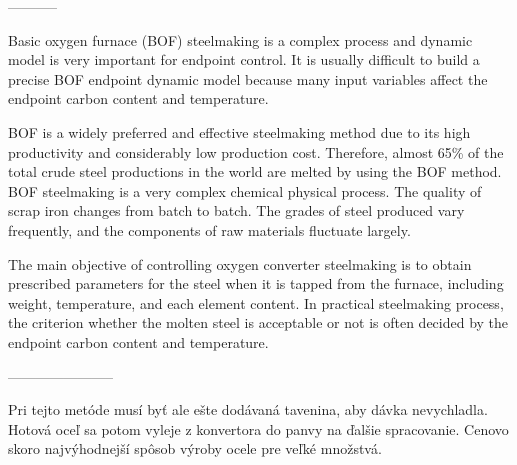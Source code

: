 -----------

Basic oxygen furnace (BOF) steelmaking is a complex process and dynamic model is very important for endpoint control. It is usually difficult to build a precise BOF endpoint dynamic model because many input variables affect the endpoint carbon content and temperature.


BOF is a widely preferred and effective steelmaking method
due to its high productivity and considerably low production cost. Therefore, almost 65\% of the total crude steel productions in the world are melted by using the BOF method. BOF steelmaking is a very complex chemical physical process. The quality of scrap iron changes from batch to batch. The grades of steel produced vary frequently, and the components of raw materials fluctuate largely.

The main objective of controlling oxygen converter steelmaking is to obtain prescribed parameters for the steel when it is tapped from the furnace, including weight, temperature, and each element content. In practical steelmaking process, the criterion whether the molten steel is acceptable or not is often decided by the endpoint carbon content and temperature.

-----------------------

Pri tejto metóde musí byť ale ešte dodávaná tavenina, aby dávka nevychladla.
Hotová oceľ sa potom vyleje z konvertora do panvy na ďalšie spracovanie.
Cenovo skoro najvýhodnejší spôsob výroby ocele pre veľké množstvá.
